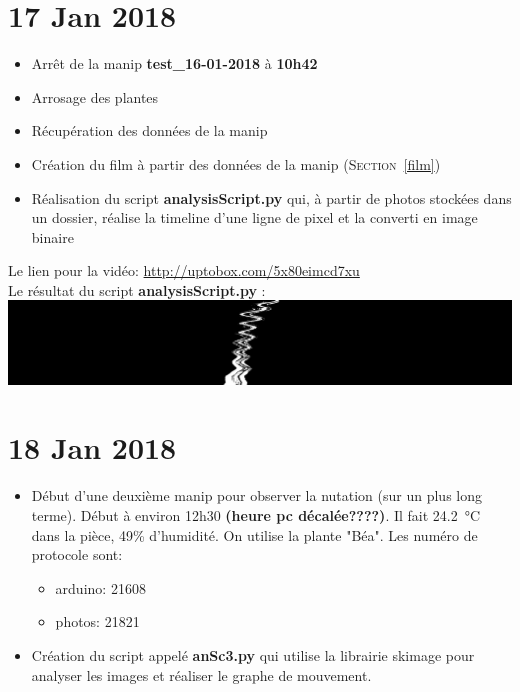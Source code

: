\documentclass[10pt,a4paper]{article}
\begin{document}
\section{17 Jan 2018}
\begin{itemize}
        \item Arrêt de la manip \textbf{test\_16-01-2018} à \textbf{10h42}
        \item Arrosage des plantes
        \item Récupération des données de la manip
        \item Création du film à partir des données de la manip (\textsc{Section}~\ref{film})
        \item Réalisation du script \textbf{analysisScript.py} qui, à partir de photos stockées dans un dossier, réalise la timeline d'une ligne de pixel et la converti en image binaire
\end{itemize}

Le lien pour la vidéo: \url{http://uptobox.com/5x80eimcd7xu}\\

Le résultat du script \textbf{analysisScript.py} :\\
\includegraphics[width = \linewidth]{imTLBWv1.jpg}

\section{18 Jan 2018}
\begin{itemize}
        \item Début d'une deuxième manip pour observer la nutation (sur un plus long terme). Début à environ 12h30 \textbf{(heure pc décalée????)}. Il fait \SI{24.2}{\celsius} dans la pièce, 49\% d'humidité. On utilise la plante "Béa". Les numéro de protocole sont:
                \begin{itemize}
                        \item arduino: 21608
                        \item photos: 21821
                \end{itemize}
        \item Création du script appelé \textbf{anSc3.py} qui utilise la librairie skimage pour analyser les images et réaliser le graphe de mouvement.

\end{itemize}
\end{document}

